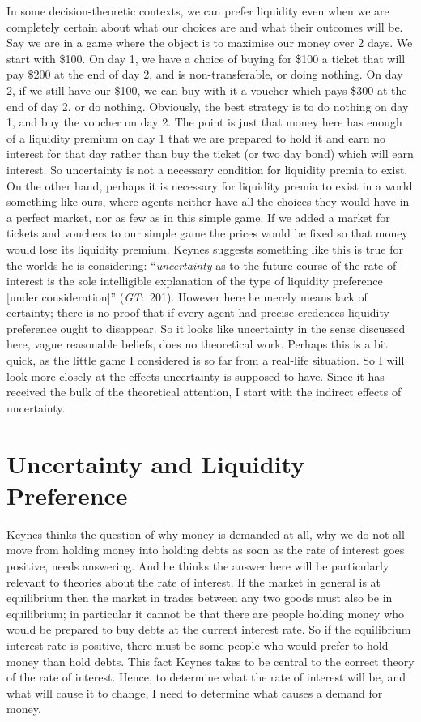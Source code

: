 \documentclass[
  10pt,
  letterpaper,
  DIV=11,
  numbers=noendperiod,
  twoside]{scrartcl}
\begin{document}
In some decision-theoretic contexts, we can prefer liquidity even when
we are completely certain about what our choices are and what their
outcomes will be. Say we are in a game where the object is to maximise
our money over 2 days. We start with \$100. On day 1, we have a choice
of buying for \$100 a ticket that will pay \$200 at the end of day 2,
and is non-transferable, or doing nothing. On day 2, if we still have
our \$100, we can buy with it a voucher which pays \$300 at the end of
day 2, or do nothing. Obviously, the best strategy is to do nothing on
day 1, and buy the voucher on day 2. The point is just that money here
has enough of a liquidity premium on day 1 that we are prepared to hold
it and earn no interest for that day rather than buy the ticket (or two
day bond) which will earn interest. So uncertainty is not a necessary
condition for liquidity premia to exist. On the other hand, perhaps it
is necessary for liquidity premia to exist in a world something like
ours, where agents neither have all the choices they would have in a
perfect market, nor as few as in this simple game. If we added a market
for tickets and vouchers to our simple game the prices would be fixed so
that money would lose its liquidity premium. Keynes suggests something
like this is true for the worlds he is considering: ``\emph{uncertainty}
as to the future course of the rate of interest is the sole intelligible
explanation of the type of liquidity preference {[}under
consideration{]}'' (\emph{GT}:~201). However here he merely means lack
of certainty; there is no proof that if every agent had precise
credences liquidity preference ought to disappear. So it looks like
uncertainty in the sense discussed here, vague reasonable beliefs, does
no theoretical work. Perhaps this is a bit quick, as the little game I
considered is so far from a real-life situation. So I will look more
closely at the effects uncertainty is supposed to have. Since it has
received the bulk of the theoretical attention, I start with the
indirect effects of uncertainty.

\section{Uncertainty and Liquidity
Preference}\label{uncertainty-and-liquidity-preference}

Keynes thinks the question of why money is demanded at all, why we do
not all move from holding money into holding debts as soon as the rate
of interest goes positive, needs answering. And he thinks the answer
here will be particularly relevant to theories about the rate of
interest. If the market in general is at equilibrium then the market in
trades between any two goods must also be in equilibrium; in particular
it cannot be that there are people holding money who would be prepared
to buy debts at the current interest rate. So if the equilibrium
interest rate is positive, there must be some people who would prefer to
hold money than hold debts. This fact Keynes takes to be central to the
correct theory of the rate of interest. Hence, to determine what the
rate of interest will be, and what will cause it to change, I need to
determine what causes a demand for money.
\end{document}
